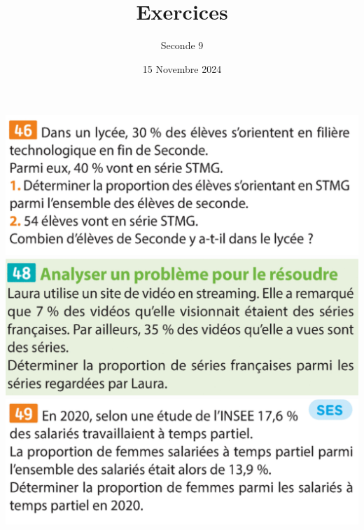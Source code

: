 \documentclass{article}
\title{Exercices}
\date{15 Novembre 2024}
\author{Seconde 9}
\begin{document}
\maketitle
\begin{center}
\includegraphics[width=\textwidth]{Exercice_1.png}
\includegraphics[width=\textwidth]{Exercice_2.png}
\includegraphics[width=\textwidth]{Exercice_3.png}
\end{center}
\end{document}
